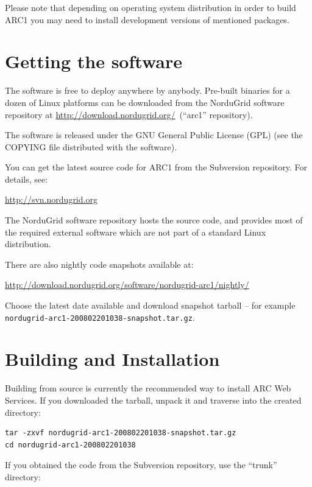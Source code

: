\documentclass{article}                            %
\newcommand{\ngdl}{\url{http://download.nordugrid.org/}~}
\begin{document}
\begin{framed}
Please note that depending on operating system distribution in order to build
ARC1 you may need to install development versions of mentioned packages.
\end{framed}

\section{Getting the software}
\label{sec:download}

The software is free to deploy anywhere by anybody. Pre-built binaries for a
dozen of Linux platforms can be downloaded from the NorduGrid software
repository at \ngdl (``arc1'' repository).

The software is released under the GNU General Public License (GPL) (see the
COPYING file distributed with the software).

You can get the latest source code for ARC1 from the Subversion repository.
For details, see:

\url{http://svn.nordugrid.org}

The NorduGrid software repository hosts the source code, and provides most of
the required external software which are not part of a standard Linux
distribution.

There are also nightly code snapshots available at:

\url{http://download.nordugrid.org/software/nordugrid-arc1/nightly/}

Choose the latest date available and download snapshot tarball -- for example\\
\verb|nordugrid-arc1-200802201038-snapshot.tar.gz|.

\section{Building and Installation}
\label{sec:build}

Building from source is currently the recommended way to install ARC Web
Services. If you downloaded the tarball, unpack it and traverse into the created
directory:

\begin{lstlisting}
tar -zxvf nordugrid-arc1-200802201038-snapshot.tar.gz
cd nordugrid-arc1-200802201038
\end{lstlisting}

If you obtained the code from the Subversion repository, use the ``trunk''
directory:
\end{document}
